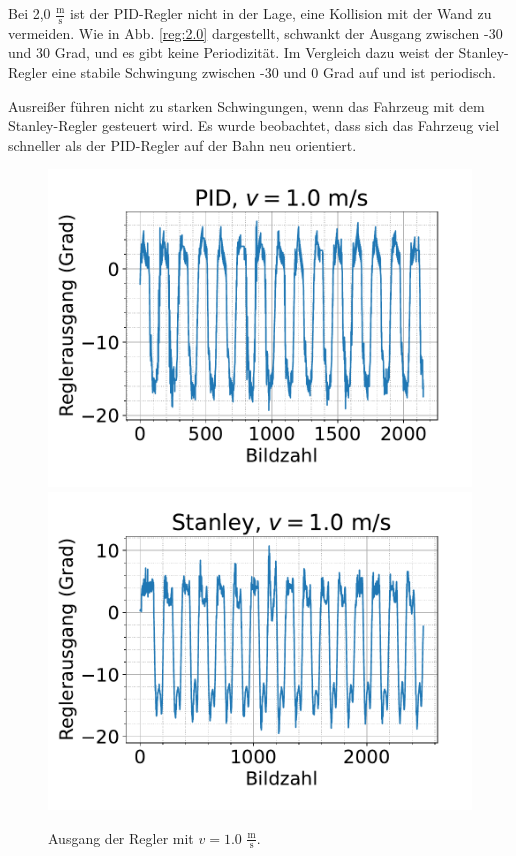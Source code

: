 \documentclass[arbeit=studie,oneside,BCOR=12mm]{ArbeitRST}
\begin{document}
Bei 2,0 $\frac{\mathrm{m}}{\mathrm{s}}$ ist der PID-Regler nicht in der Lage,
eine Kollision mit der Wand zu vermeiden. Wie in Abb. \ref{reg:2.0}
dargestellt, schwankt der Ausgang zwischen -30 und 30 Grad, und es gibt keine
Periodizität. Im Vergleich dazu weist der Stanley-Regler eine stabile
Schwingung zwischen -30 und 0 Grad auf und ist periodisch.

Ausreißer führen nicht zu starken Schwingungen, wenn das Fahrzeug mit dem
Stanley-Regler gesteuert wird. Es wurde beobachtet, dass sich das Fahrzeug viel
schneller als der PID-Regler auf der Bahn neu orientiert.

\begin{figure}[h]
    \centering
    \includegraphics[scale=0.47]{pid1.0}
    \includegraphics[scale=0.47]{Stan1.0}
    \caption{Ausgang der Regler mit $v = 1.0$ $\frac{\mathrm{m}}{\mathrm{s}}$.}
    \label{reg:1.0}
\end{figure}
\end{document}
